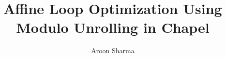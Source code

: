 \documentclass[10pt,letterpaper,twocolumn]{article}
\begin{document}
\title{Affine Loop Optimization Using Modulo Unrolling in Chapel}
\author{Aroon Sharma}

           
\maketitle












%


{
\begin{singlespace}
\vspace{-3ex}

\vspace{-2ex}

\end{singlespace}
}
\end{document}
